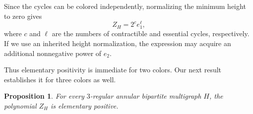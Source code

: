 \documentclass[11pt]{article}
\newtheorem{proposition}[theorem]{Proposition}
\theoremstyle{definition}
\theoremstyle{remark}
\begin{document}
Since the cycles can be colored independently,
normalizing the minimum height to zero gives
\begin{equation}\label{eq:two-color}
Z_H=2^c e_1^\ell,
\end{equation}
where $c$ and $\ell$ are the numbers of
contractible and essential cycles, respectively.
If we use an inherited height normalization,
the expression may acquire an additional
nonnegative power of $e_2$.

Thus elementary positivity is immediate for
two colors. Our next result establishes it
for three colors as well.

\begin{proposition}\label{prop:threecolor}
For every $3$-regular annular bipartite
multigraph $H$, the polynomial $Z_H$
is elementary positive.
\end{proposition}
\end{document}
